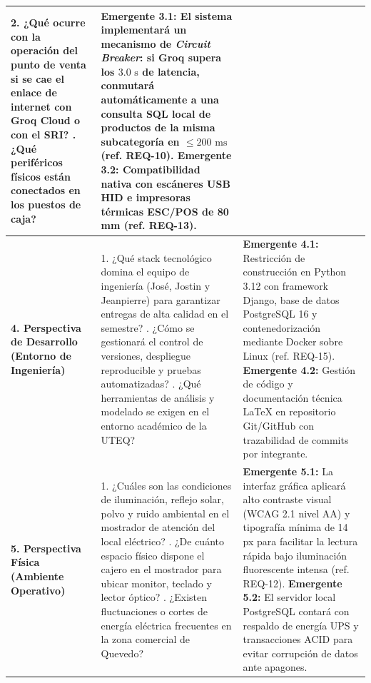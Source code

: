 \begin{table}[htbp]
\begin{tabularx}{\textwidth}{l Y Y}
2. ¿Qué ocurre con la operación del punto de venta si se cae el enlace de internet con Groq Cloud o con el SRI? . ¿Qué periféricos físicos están conectados en los puestos de caja? & 
\textbf{Emergente 3.1:} El sistema implementará un mecanismo de \textit{Circuit Breaker}: si Groq supera los $3.0\text{ s}$ de latencia, conmutará automáticamente a una consulta SQL local de productos de la misma subcategoría en $\le 200\text{ ms}$ (ref. REQ-10). \newline
\textbf{Emergente 3.2:} Compatibilidad nativa con escáneres USB HID e impresoras térmicas ESC/POS de 80 mm (ref. REQ-13). \\
\midrule
\textbf{4. Perspectiva de Desarrollo (Entorno de Ingeniería)} & 
1. ¿Qué stack tecnológico domina el equipo de ingeniería (José, Jostin y Jeanpierre) para garantizar entregas de alta calidad en el semestre? . ¿Cómo se gestionará el control de versiones, despliegue reproducible y pruebas automatizadas? . ¿Qué herramientas de análisis y modelado se exigen en el entorno académico de la UTEQ? & 
\textbf{Emergente 4.1:} Restricción de construcción en Python 3.12 con framework Django, base de datos PostgreSQL 16 y contenedorización mediante Docker sobre Linux (ref. REQ-15). \newline
\textbf{Emergente 4.2:} Gestión de código y documentación técnica LaTeX en repositorio Git/GitHub con trazabilidad de commits por integrante. \\
\midrule
\textbf{5. Perspectiva Física (Ambiente Operativo)} & 
1. ¿Cuáles son las condiciones de iluminación, reflejo solar, polvo y ruido ambiental en el mostrador de atención del local eléctrico? . ¿De cuánto espacio físico dispone el cajero en el mostrador para ubicar monitor, teclado y lector óptico? . ¿Existen fluctuaciones o cortes de energía eléctrica frecuentes en la zona comercial de Quevedo? & 
\textbf{Emergente 5.1:} La interfaz gráfica aplicará alto contraste visual (WCAG 2.1 nivel AA) y tipografía mínima de 14 px para facilitar la lectura rápida bajo iluminación fluorescente intensa (ref. REQ-12). \newline
\textbf{Emergente 5.2:} El servidor local PostgreSQL contará con respaldo de energía UPS y transacciones ACID para evitar corrupción de datos ante apagones. \\
\midrule

\end{tabularx}
\end{table}
